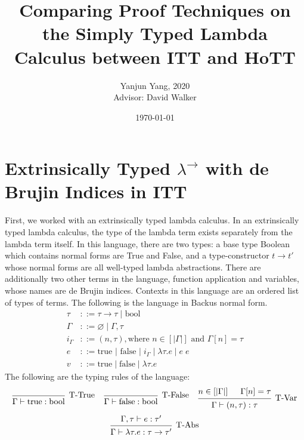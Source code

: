 \documentclass[12pt, letterpaper]{article}
\title{Comparing Proof Techniques on the Simply Typed Lambda Calculus between ITT and HoTT}
\author{Yanjun Yang, 2020\\Advisor: David Walker}
\date{\today}
\begin{document}
\doublespacing
\maketitle


\section{Extrinsically Typed $\lambda^{\to}$ with de Brujin Indices in ITT}
\begin{flushleft}
First, we worked with an extrinsically typed lambda calculus. In an extrinsically typed lambda calculus, the type of the lambda term exists separately from the lambda term itself. In this language, there are two types: a base type Boolean which contains normal forms are True and False, and a type-constructor $t\to t'$ whose normal forms are all well-typed lambda abstractions. There are additionally two other terms in the language, function application and variables, whose names are de Brujin indices. Contexts in this language are an ordered list of types of terms. The following is the language in Backus normal form.
\begin{align*}
\tau &::= \tau \to \tau\;|\text{ bool}\\
\Gamma &::= \varnothing\;|\;\Gamma, \tau\;\\
i_{\Gamma} &::= (n , \tau), \text{where } n \in [|\Gamma|] \text{ and } \Gamma[n] = \tau\\
e &::= \text{true } | \text{ false } | \; i_{\Gamma} \;| \;\lambda \tau.e \; | \; e
\;e\\
v &::= \text{true}\;|\;\text{false}\;|\;\lambda \tau . e
\end{align*}
The following are the typing rules of the language:
\[
\begin{prooftree}
\infer0[T-True]{\Gamma \vdash \text{true} : \text{bool}}	
\end{prooftree}
\;\;\;\;
\begin{prooftree}
\infer0[T-False]{\Gamma \vdash \text{false} : \text{bool}}
\end{prooftree}
\;\;\;\;
\begin{prooftree}
\hypo{n \in [|\Gamma|]}
\hypo{\Gamma[n] = \tau}
\infer2[T-Var]{\Gamma \vdash (n, \tau) : \tau}
\end{prooftree}
\]
\[
\begin{prooftree}
\hypo{\Gamma, \tau \vdash e : \tau'}
\infer1[T-Abs]{\Gamma \vdash \lambda \tau . e : \tau \to \tau'}

\end{prooftree}\]
\end{flushleft}
\end{document}
